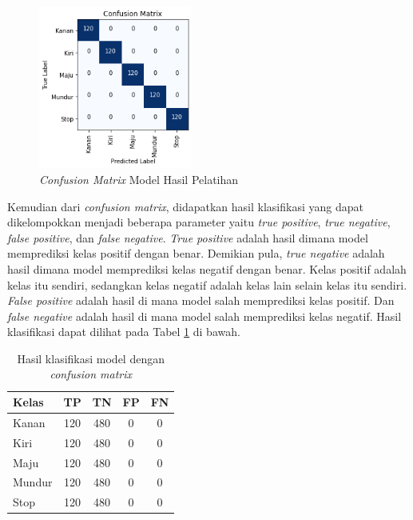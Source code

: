 \begin{figure} [ht] \centering
  \includegraphics[width=0.45\textwidth]{gambar/bab4/model5 (30cm)/matrix.png}
  \caption{\emph{Confusion Matrix} Model Hasil Pelatihan}
  \label{fig:matrix1}
\end{figure}

Kemudian dari \emph{confusion matrix}, didapatkan hasil klasifikasi yang dapat dikelompokkan menjadi beberapa parameter yaitu \emph{true positive}, \emph{true negative}, \emph{false positive}, dan \emph{false negative}. \emph{True positive} adalah hasil dimana model memprediksi kelas positif dengan benar. Demikian pula, \emph{true negative} adalah hasil dimana model memprediksi kelas negatif dengan benar. Kelas positif adalah kelas itu sendiri, sedangkan kelas negatif adalah kelas lain selain kelas itu sendiri. \emph{False positive} adalah hasil di mana model salah memprediksi kelas positif. Dan \emph{false negative} adalah hasil di mana model salah memprediksi kelas negatif. Hasil klasifikasi dapat dilihat pada Tabel \ref{tb:cm_model} di bawah.

\begin{longtable}{|l|c|c|c|c|}
  \caption{Hasil klasifikasi model dengan \emph{confusion matrix}}
  \label{tb:cm_model} \\
  \hline
  \rowcolor[HTML]{C0C0C0} 
  \textbf{Kelas} & \textbf{TP} & \textbf{TN} & \textbf{FP} & \textbf{FN} \\ \hline
  Kanan    & 120          & 480         & 0           & 0           \\ \hline
  Kiri      & 120          & 480         & 0           & 0           \\ \hline
  Maju      & 120          & 480         & 0           & 0           \\ \hline
  Mundur     & 120          & 480         & 0           & 0           \\ \hline
  Stop  & 120          & 480         & 0           & 0           \\ \hline
\end{longtable}

